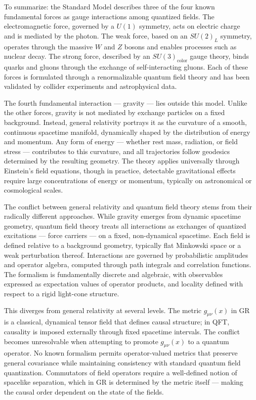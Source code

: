 To summarize: the Standard Model describes three of the four known fundamental forces as gauge interactions among quantized fields. The electromagnetic force, governed by a $U(1)$ symmetry, acts on electric charge and is mediated by the photon. The weak force, based on an $SU(2)_L$ symmetry, operates through the massive $W$ and $Z$ bosons and enables processes such as nuclear decay. The strong force, described by an $SU(3)_\text{color}$ gauge theory, binds quarks and gluons through the exchange of self-interacting gluons. Each of these forces is formulated through a renormalizable quantum field theory and has been validated by collider experiments and astrophysical data.

The fourth fundamental interaction — gravity — lies outside this model. Unlike the other forces, gravity is not mediated by exchange particles on a fixed background. Instead, general relativity portrays it as the curvature of a smooth, continuous spacetime manifold, dynamically shaped by the distribution of energy and momentum. Any form of energy — whether rest mass, radiation, or field stress — contributes to this curvature, and all trajectories follow geodesics determined by the resulting geometry. The theory applies universally through Einstein's field equations, though in practice, detectable gravitational effects require large concentrations of energy or momentum, typically on astronomical or cosmological scales.

The conflict between general relativity and quantum field theory stems from their radically different approaches. While gravity emerges from dynamic spacetime geometry, quantum field theory treats all interactions as exchanges of quantized excitations — force carriers — on a fixed, non-dynamical spacetime. Each field is defined relative to a background geometry, typically flat Minkowski space or a weak perturbation thereof. Interactions are governed by probabilistic amplitudes and operator algebra, computed through path integrals and correlation functions. The formalism is fundamentally discrete and algebraic, with observables expressed as expectation values of operator products, and locality defined with respect to a rigid light-cone structure.

This  diverges from general relativity at several levels. The metric $g_{\mu\nu}(x)$ in GR is a classical, dynamical tensor field that defines causal structure; in QFT, causality is imposed externally through fixed spacetime intervals. The conflict becomes unresolvable when attempting to promote $g_{\mu\nu}(x)$ to a quantum operator. No known formalism permits operator-valued metrics that preserve general covariance while maintaining consistency with standard quantum field quantization. Commutators of field operators require a well-defined notion of spacelike separation, which in GR is determined by the metric itself — making the causal order dependent on the state of the fields.

